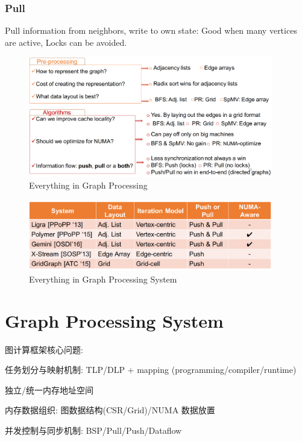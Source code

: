 \documentclass[UTF8,12pt,a4paper]{article}
\begin{document}
\subsubsection{Pull}
Pull information from neighbors, write to own state:
Good when many vertices are active, Locks can be avoided.
\begin{figure}
  \begin{small}
    \begin{center}
      \includegraphics[width=0.95\textwidth]{figures/graph_atc17_everythinggraph1}
    \end{center}
    \caption{Everything in Graph Processing~\cite{DBLP:conf/usenix/MalicevicLZ17}}
    \label{fig:everythinggraph1}
  \end{small}
\end{figure}
\begin{figure}
  \begin{small}
    \begin{center}
      \includegraphics[width=0.95\textwidth]{figures/graph_atc17_everythinggraph2}
    \end{center}
    \caption{Everything in Graph Processing System~\cite{DBLP:conf/usenix/MalicevicLZ17}}
    \label{fig:everythinggraph2}
  \end{small}
\end{figure}
\clearpage

\section{Graph Processing System}
图计算框架核心问题:
\begin{compactitem}
  \item 任务划分与映射机制: TLP/DLP + mapping (programming/compiler/runtime)
  \item 独立/统一内存地址空间
  \item 内存数据组织: 图数据结构(CSR/Grid)/NUMA 数据放置
  \item 并发控制与同步机制: BSP/Pull/Push/Dataflow
\end{compactitem}
\end{document}
